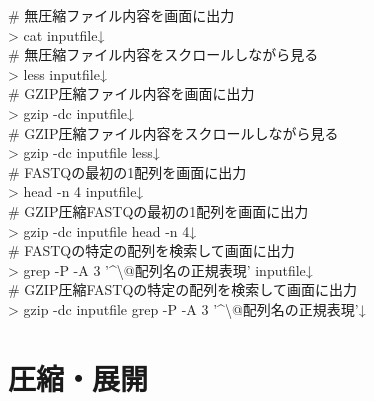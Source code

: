 \documentclass[titlepage,10pt,a4paper,english]{jsbook}
\newenvironment{cmd}{\begin{oframed}\raggedright\ttfamily\footnotesize\setlength{\baselineskip}{1.4em}}{\end{oframed}\vspace{-1em}}
\begin{document}
\begin{cmd}
\# 無圧縮ファイル内容を画面に出力\\
{\textgreater} cat inputfile↓\\
\# 無圧縮ファイル内容をスクロールしながら見る\\
{\textgreater} less inputfile↓\\
\# GZIP圧縮ファイル内容を画面に出力\\
{\textgreater} gzip -dc inputfile↓\\
\# GZIP圧縮ファイル内容をスクロールしながら見る\\
{\textgreater} gzip -dc inputfile {\textbar} less↓\\
\# FASTQの最初の1配列を画面に出力\\
{\textgreater} head -n 4 inputfile↓\\
\# GZIP圧縮FASTQの最初の1配列を画面に出力\\
{\textgreater} gzip -dc inputfile {\textbar} head -n 4↓\\
\# FASTQの特定の配列を検索して画面に出力\\
{\textgreater} grep -P -A 3 '{\textasciicircum}{\textbackslash}@配列名の正規表現' inputfile↓\\
\# GZIP圧縮FASTQの特定の配列を検索して画面に出力\\
{\textgreater} gzip -dc inputfile {\textbar} grep -P -A 3 '{\textasciicircum}{\textbackslash}@配列名の正規表現'↓
\end{cmd}

\section{圧縮・展開}
\end{document}
